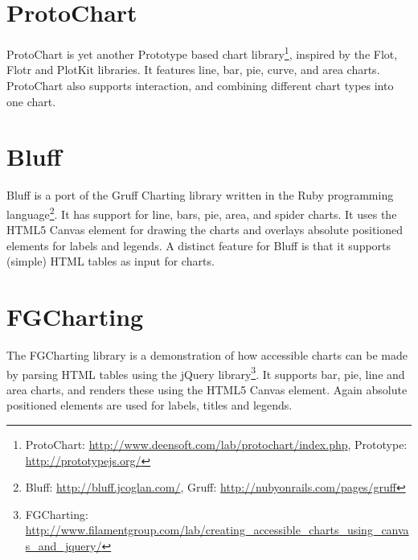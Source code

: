 \section*{ProtoChart}
ProtoChart is yet another Prototype based chart library\footnote{ProtoChart: \url{http://www.deensoft.com/lab/protochart/index.php}, Prototype: \url{http://prototypejs.org/}}, inspired by the Flot, Flotr and PlotKit libraries. It features line, bar, pie, curve, and area charts. ProtoChart also supports interaction, and combining different chart types into one chart.

\section*{Bluff}
Bluff is a port of the Gruff Charting library written in the Ruby programming language\footnote{Bluff: \url{http://bluff.jcoglan.com/}, Gruff: \url{http://nubyonrails.com/pages/gruff}}. It has support for line, bars, pie, area, and spider charts. It uses the HTML5 Canvas element for drawing the charts and overlays absolute positioned  elements for labels and legends. A distinct feature for Bluff is that it supports (simple) HTML tables as input for charts.

\section*{FGCharting}
The FGCharting library is a demonstration of how accessible charts can be made by parsing HTML tables using the jQuery library\footnote{FGCharting: \url{http://www.filamentgroup.com/lab/creating\_accessible\_charts\_using\_canvas\_and\_jquery/}}. It supports bar, pie, line and area charts, and renders these using the HTML5 Canvas element. Again absolute positioned  elements are used for labels, titles and legends.
